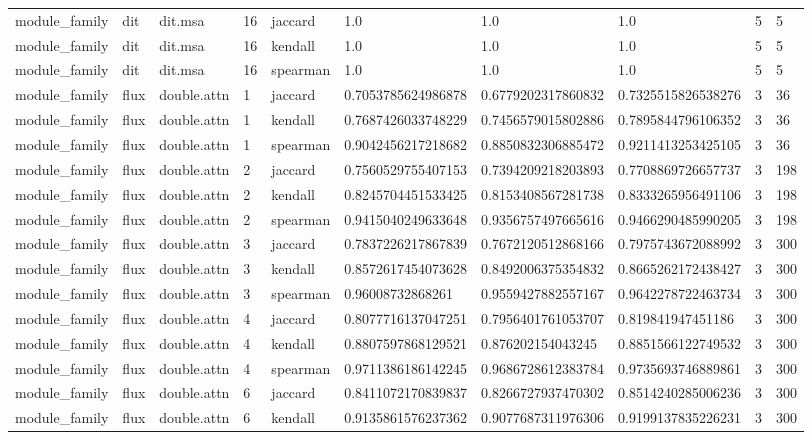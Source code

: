 \begin{tabular}{llllllllll}
module\_family & dit & dit.msa & 16 & jaccard & 1.0 & 1.0 & 1.0 & 5 & 5 \\
module\_family & dit & dit.msa & 16 & kendall & 1.0 & 1.0 & 1.0 & 5 & 5 \\
module\_family & dit & dit.msa & 16 & spearman & 1.0 & 1.0 & 1.0 & 5 & 5 \\
module\_family & flux & double.attn & 1 & jaccard & 0.7053785624986878 & 0.6779202317860832 & 0.7325515826538276 & 3 & 36 \\
module\_family & flux & double.attn & 1 & kendall & 0.7687426033748229 & 0.7456579015802886 & 0.7895844796106352 & 3 & 36 \\
module\_family & flux & double.attn & 1 & spearman & 0.9042456217218682 & 0.8850832306885472 & 0.9211413253425105 & 3 & 36 \\
module\_family & flux & double.attn & 2 & jaccard & 0.7560529755407153 & 0.7394209218203893 & 0.7708869726657737 & 3 & 198 \\
module\_family & flux & double.attn & 2 & kendall & 0.8245704451533425 & 0.8153408567281738 & 0.8333265956491106 & 3 & 198 \\
module\_family & flux & double.attn & 2 & spearman & 0.9415040249633648 & 0.9356757497665616 & 0.9466290485990205 & 3 & 198 \\
module\_family & flux & double.attn & 3 & jaccard & 0.7837226217867839 & 0.7672120512868166 & 0.7975743672088992 & 3 & 300 \\
module\_family & flux & double.attn & 3 & kendall & 0.8572617454073628 & 0.8492006375354832 & 0.8665262172438427 & 3 & 300 \\
module\_family & flux & double.attn & 3 & spearman & 0.96008732868261 & 0.9559427882557167 & 0.9642278722463734 & 3 & 300 \\
module\_family & flux & double.attn & 4 & jaccard & 0.8077716137047251 & 0.7956401761053707 & 0.819841947451186 & 3 & 300 \\
module\_family & flux & double.attn & 4 & kendall & 0.8807597868129521 & 0.876202154043245 & 0.8851566122749532 & 3 & 300 \\
module\_family & flux & double.attn & 4 & spearman & 0.9711386186142245 & 0.9686728612383784 & 0.9735693746889861 & 3 & 300 \\
module\_family & flux & double.attn & 6 & jaccard & 0.8411072170839837 & 0.8266727937470302 & 0.8514240285006236 & 3 & 300 \\
module\_family & flux & double.attn & 6 & kendall & 0.9135861576237362 & 0.9077687311976306 & 0.9199137835226231 & 3 & 300 \\

\end{tabular}
